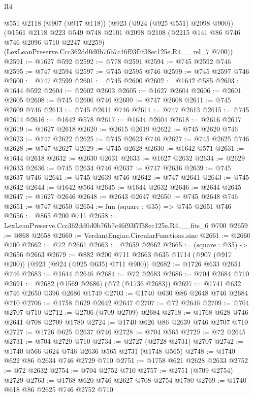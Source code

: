 \begin{lexlean}{R4}
\begin{coremodule}
    @551
    @2118
    (@907 (@917 @118))
    (@923 (@924 (@925 @551) @2098 @900))
    (@1561
      @2118
      @223
      @549
      @748
      @2101
      @2098
      @2108
      (@2215 @141 @86 @746 @746 @2096 @710 @2247 @2259)
      (LexLeanPreserve.Ccc362dd0d0b76b7c46f93f7f38ec125e.R4.__rel_7 @700))
@2591 := @1627 @592
@2592 := @778 @2591
@2594 := @745 @2592 @746
@2595 := @747 @2594
@2597 := @745 @2595 @746
@2599 := @745 @2597 @746
@2600 := @747 @2599
@2601 := @745 @2600
@2602 := @1642 @585
@2603 := @1644 @592
@2604 := @2602 @2603
@2605 := @1627 @2604
@2606 := @2601 @2605
@2608 := @745 @2606 @746
@2609 := @747 @2608
@2611 := @745 @2609 @746
@2613 := @745 @2611 @746
@2614 := @747 @2613
@2615 := @745 @2614
@2616 := @1642 @578
@2617 := @1644 @2604
@2618 := @2616 @2617
@2619 := @1627 @2618
@2620 := @2615 @2619
@2622 := @745 @2620 @746
@2623 := @747 @2622
@2625 := @745 @2623 @746
@2627 := @745 @2625 @746
@2628 := @747 @2627
@2629 := @745 @2628
@2630 := @1642 @571
@2631 := @1644 @2618
@2632 := @2630 @2631
@2633 := @1627 @2632
@2634 := @2629 @2633
@2636 := @745 @2634 @746
@2637 := @747 @2636
@2639 := @745 @2637 @746
@2641 := @745 @2639 @746
@2642 := @747 @2641
@2643 := @745 @2642
@2644 := @1642 @564
@2645 := @1644 @2632
@2646 := @2644 @2645
@2647 := @1627 @2646
@2648 := @2643 @2647
@2650 := @745 @2648 @746
@2651 := @747 @2650
@2654 := fun (square : @35) => @745 @2651 @746
@2656 := @865 @200 @711
@2658 := LexLeanPreserve.Ccc362dd0d0b76b7c46f93f7f38ec125e.R4.__fits_6 @700
@2659 := @868 @2658
@2660 := VerdantEngine.CircularFunctions.sinc
@2661 := @2660 @700
@2662 := @72 @2661
@2663 := @2659 @2662
@2665 := (square : @35) -> @2656 @2663
@2679 := @882 @200 @711 @2663 @635 @1714 (@907 (@917 @200)) (@923 (@924 (@925 @635) @711 @900))
@2682 := @1726 @633 @2651 @746
@2683 := @1644 @2646
@2684 := @72 @2683
@2686 := @704 @2684 @710
@2691 := @2682 (@1569 @2686) (@72 (@1736 @2683))
@2697 := @1741 @632 @746 @2650 @396 @2686 @1749
@2703 := @1740 @630 @86 @2648 @746 @2684 @710
@2706 := @1758 @629 @2642 @2647
@2707 := @72 @2646
@2709 := @704 @2707 @710
@2712 := @2706 (@709 @2709) @2684
@2718 := @1768 @628 @746 @2641 @708 @2709 @1780
@2724 := @1740 @626 @86 @2639 @746 @2707 @710
@2727 := @1726 @625 @2637 @746
@2728 := @704 @565
@2729 := @72 @2645
@2731 := @704 @2729 @710
@2734 := @2727 (@2728 @2731) @2707
@2742 := @1740 @566 @624 @746 @2636 @565 @2731 (@1748 @565)
@2748 := @1740 @622 @86 @2634 @746 @2729 @710
@2751 := @1758 @621 @2628 @2633
@2752 := @72 @2632
@2754 := @704 @2752 @710
@2757 := @2751 (@709 @2754) @2729
@2763 := @1768 @620 @746 @2627 @708 @2754 @1780
@2769 := @1740 @618 @86 @2625 @746 @2752 @710

\end{coremodule}
\end{lexlean}
